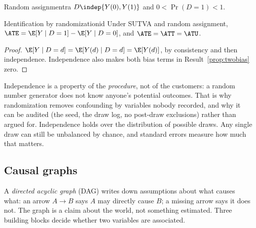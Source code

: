 \documentclass[11pt]{article}
\begin{document}
\begin{assum}{Random assignment}{ra}
$D \indep \{Y(0), Y(1)\}$ and $0 < \Pr(D=1) < 1$.
\end{assum}

\begin{prop}{Identification by randomization}{id}
Under SUTVA and random assignment, $\ATE = \E[Y \mid D=1] - \E[Y \mid D=0]$, and $\ATE = \ATT = \ATU$.
\end{prop}
\begin{proof}
$\E[Y \mid D=d] = \E[Y(d) \mid D=d] = \E[Y(d)]$, by consistency and then independence. Independence also
makes both bias terms in Result~\ref{prop:twobias} zero.
\end{proof}

Independence is a property of the \emph{procedure}, not of the customers: a random number generator does
not know anyone's potential outcomes. That is why randomization removes confounding by variables nobody
recorded, and why it can be audited (the seed, the draw log, no post-draw exclusions) rather than argued
for. Independence holds over the distribution of possible draws. Any single draw can still be unbalanced by
chance, and standard errors measure how much that matters.

\subsection{Causal graphs}

A \emph{directed acyclic graph} (DAG) writes down assumptions about what causes what: an arrow $A \to B$
says $A$ may directly cause $B$; a missing arrow says it does not. The graph is a claim about the world,
not something estimated. Three building blocks decide whether two variables are associated.

\begin{center}
\end{center}
\end{document}
